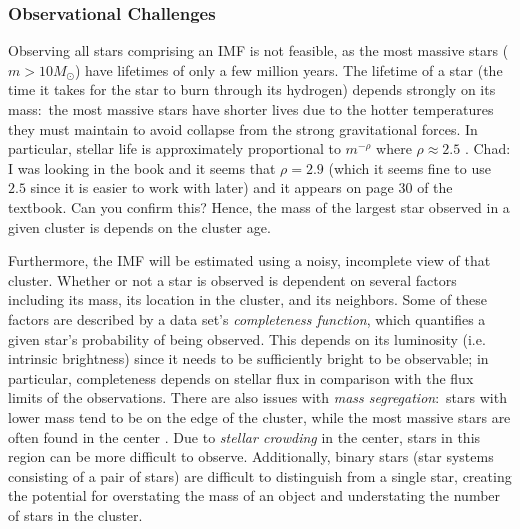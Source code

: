 \documentclass[12pt]{article}
\newcommand{\Msun}{M_{\odot}}
\begin{document}
\subsubsection{Observational Challenges} \label{sec:observational}
Observing all stars comprising an IMF 
is not feasible, as the most massive stars ($m > 10 \Msun$) have lifetimes of 
only a few million years.
The lifetime of a star (the time it takes for the star to burn through its
hydrogen) depends strongly on its mass:~the most massive
stars have shorter lives due to the hotter temperatures they must maintain
to avoid collapse from the strong gravitational forces. In particular,
stellar life is 
approximately proportional to $m^{-\rho}$ 
where $\rho \approx 2.5$ \citep[p. 28]{hansen2004}. {\color{red} Chad:  I was looking in the book and it seems that $\rho = 2.9$ (which it seems fine to use $2.5$ since it is easier to work with later) and it appears on page 30 of the textbook.  Can you confirm this? }
Hence, the mass of the largest star observed in a given 
cluster is depends on the cluster age.  %

Furthermore, the IMF will be estimated using a noisy, incomplete view of that cluster.  Whether or not a star is observed is dependent on several factors including its mass, its location in the cluster, and its neighbors.  Some of these factors are described by a data set's \emph{completeness function}, which quantifies a given star's probability of being observed.  This depends on its luminosity (i.e. intrinsic brightness) since it needs to be sufficiently bright to be observable; in particular, completeness depends on stellar flux in comparison with the flux limits of the observations.
There are also issues with {\it mass segregation}:~stars with lower mass tend to be on the edge of the cluster, while the most massive stars are often
found in the center \citep{weisz13}. Due to {\it stellar crowding} in the center, stars in this region can be more difficult to observe.  Additionally, binary stars (star systems consisting of a pair of stars) 
are difficult to distinguish from a single star, creating the potential for overstating the mass of an object and understating the number of stars in the cluster.
\end{document}
